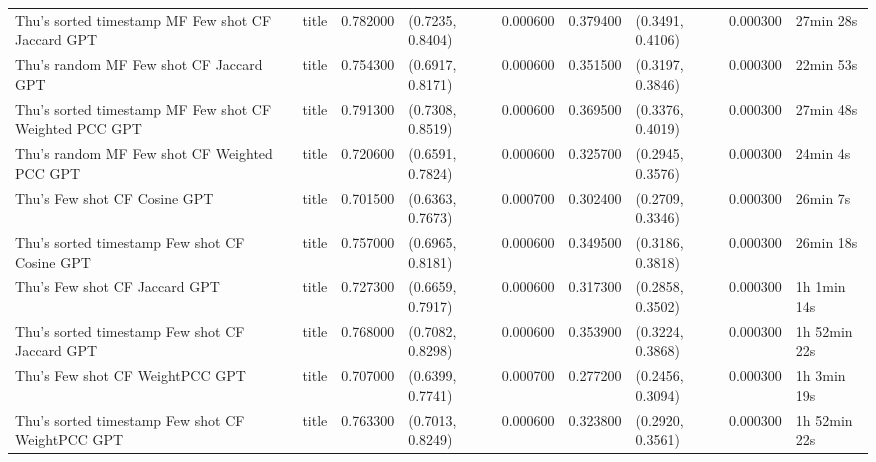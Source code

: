 \begin{tabular}{llrllrlll}
Thu's sorted timestamp MF Few shot CF Jaccard GPT & title & 0.782000 & (0.7235, 0.8404) & 0.000600 & 0.379400 & (0.3491, 0.4106) & 0.000300 & 27min 28s \\
Thu's random MF Few shot CF Jaccard GPT & title & 0.754300 & (0.6917, 0.8171) & 0.000600 & 0.351500 & (0.3197, 0.3846) & 0.000300 & 22min 53s \\
Thu's sorted timestamp MF Few shot CF Weighted PCC GPT & title & 0.791300 & (0.7308, 0.8519) & 0.000600 & 0.369500 & (0.3376, 0.4019) & 0.000300 & 27min 48s \\
Thu's random MF Few shot CF Weighted PCC GPT & title & 0.720600 & (0.6591, 0.7824) & 0.000600 & 0.325700 & (0.2945, 0.3576) & 0.000300 & 24min 4s \\
Thu's Few shot CF Cosine GPT & title & 0.701500 & (0.6363, 0.7673) & 0.000700 & 0.302400 & (0.2709, 0.3346) & 0.000300 & 26min 7s \\
Thu's sorted timestamp Few shot CF Cosine GPT & title & 0.757000 & (0.6965, 0.8181) & 0.000600 & 0.349500 & (0.3186, 0.3818) & 0.000300 & 26min 18s \\
Thu's Few shot CF Jaccard GPT & title & 0.727300 & (0.6659, 0.7917) & 0.000600 & 0.317300 & (0.2858, 0.3502) & 0.000300 & 1h 1min 14s \\
Thu's sorted timestamp Few shot CF Jaccard GPT & title & 0.768000 & (0.7082, 0.8298) & 0.000600 & 0.353900 & (0.3224, 0.3868) & 0.000300 & 1h 52min 22s \\
Thu's Few shot CF WeightPCC GPT & title & 0.707000 & (0.6399, 0.7741) & 0.000700 & 0.277200 & (0.2456, 0.3094) & 0.000300 & 1h 3min 19s \\
Thu's sorted timestamp Few shot CF WeightPCC GPT & title & 0.763300 & (0.7013, 0.8249) & 0.000600 & 0.323800 & (0.2920, 0.3561) & 0.000300 & 1h 52min 22s \\
\end{tabular}

